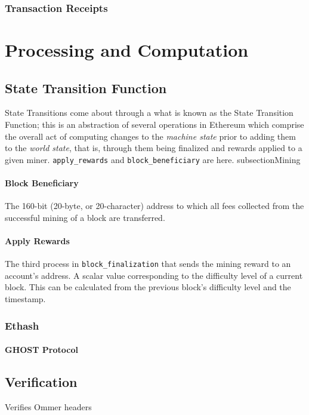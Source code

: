 \documentclass[10pt,a4paper,leqno,bibliography=totoc]{scrartcl}
\newenvironment{alphafootnotes}
{\par\edef\savedfootnotenumber{\number\value{footnote}}
\renewcommand{\thefootnote}{\alph{footnote}}
\setcounter{footnote}{0}}
{\par\setcounter{footnote}{\savedfootnotenumber}}
\begin{document}
\begin{alphafootnotes}
\begin{multicols*}{2}
		\subsubsection{Transaction Receipts}


	\section{Processing and Computation}
	
		\subsection{State Transition Function}
		State Transitions come about through a what is known as the State Transition Function; this is an abstraction of several operations in Ethereum which comprise the overall act of computing changes to the \textit{machine state} prior to adding them to the \textit{world state}, that is, through them being finalized and rewards applied to a given miner. \texttt{apply\_rewards} and \texttt{block\_beneficiary} are here.
		subsection{Mining}
			\paragraph{Block Beneficiary} The 160-bit (20-byte, or 20-character) address to which all fees collected from the successful mining of a block are transferred.
			\paragraph{Apply Rewards} The third process in \texttt{block\_finalization} that sends the mining reward to an account's address. A scalar value corresponding to the difficulty level of a current block. This can be calculated from the previous block's difficulty level and the timestamp. 

			\subsubsection{Ethash}
	
			\paragraph{GHOST Protocol}

		\subsection{Verification}
		    Verifies Ommer headers


\end{multicols*}
\end{alphafootnotes}
\end{document}
